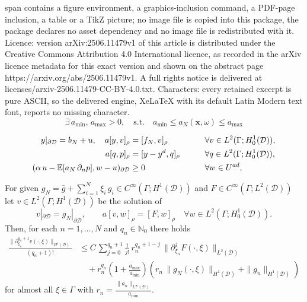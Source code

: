 \documentclass[10pt,a4paper]{amsart}
\newcommand{\E}{{\mathbb{E}}}
\newcommand{\cD}{{\mathcal{D}}}
\begin{document}
span contains a figure environment, a graphics-inclusion command, a PDF-page inclusion, a table or a TikZ picture; no image file is copied into this package, the package declares no asset dependency and no image file is redistributed with it. Licence: version arXiv:2506.11479v1 of this article is distributed under the Creative Commons Attribution 4.0 International licence, as recorded in the arXiv licence metadata for this exact version and shown on the abstract page https://arxiv.org/abs/2506.11479v1. A full rights notice is delivered at licenses/arxiv-2506.11479-CC-BY-4.0.txt. Characters: every retained excerpt is pure ASCII, so the delivered engine, XeLaTeX with its default Latin Modern text font, reports no missing character.
\begin{equation}\label{assumption_truncatedD}
  \exists \, a_{\min}, \, a_{\max} >0, \quad \text{s.t.} \quad a_{\min} \leq  a_{N}(\boldsymbol{x},\omega) \leq a_{\max}
\end{equation}

    \begin{alignat}{2}
        y|_{\partial\cD}= b_{N} + u,\quad a[y,v]_{\rho} &= [f_N,v]_{\rho} &\qquad &\forall v\in L^2(\Gamma; H_0^1(\cD)),\label{eq:opt_pa}\\
        a[q,p]_{\rho} &= [y-y^d,q]_{\rho} &&\forall q\in L^2(\Gamma; H_0^1(\cD)), \label{eq:opt_pb}\\
        (\alpha\,u - \E[a_{N}\,\partial_n p], w-u)_{\partial \cD} &\geq 0 &&\forall w \in U^{\textup{ad}}, \label{eq:opt_pc}
      \end{alignat}

\begin{lemma}
  \label{lem:regularity_derivatives_xi}
  For given $g_N= \bar g + \sum_{i=1}^N\xi_i\,g_i\in C^\infty(\Gamma; H^1(\cD))$ and $F\in C^\infty(\Gamma; L^2(\cD))$ let $v\in L^2(\Gamma; H^1(\cD))$ be the solution of
  \begin{equation}\label{eq:general_bvp}
    v|_{\partial \cD} = g_N|_{\partial \cD},\qquad a[v,w]_\rho = [F,w]_\rho\quad \forall w\in L^2(\Gamma; H_0^1(\cD)).
  \end{equation}
  Then, for each $n=1,\ldots,N$ and $q_n\in \mathbb N_0$ there holds 
  \begin{align*}
    \frac{\|\partial_{\xi_n}^{q_n+1} v(\cdot,\xi)\|_{H^1(\cD)}}{(q_n + 1)!}
    &\le C\,\sum_{j=0}^{q_n+1} \frac{1}{j!}\,r_n^{q_n+1-j}\,\|\partial_{\xi_n}^j F(\cdot,\xi)\|_{L^2(\cD)} \\
    &\quad + r_n^{q_n}(1+\frac{a_{\max}}{a_{\min}})\left(r_n\,\|g_N(\cdot,\xi)\|_{H^1(\cD)} + \|g_n\|_{H^1(\cD)}\right)
  \end{align*}
   for almost all $\xi\in \Gamma$ with $r_n = \frac{\|a_n\|_{L^\infty( \cD)}}{a_{\min}}$.
\end{lemma}
\end{document}
